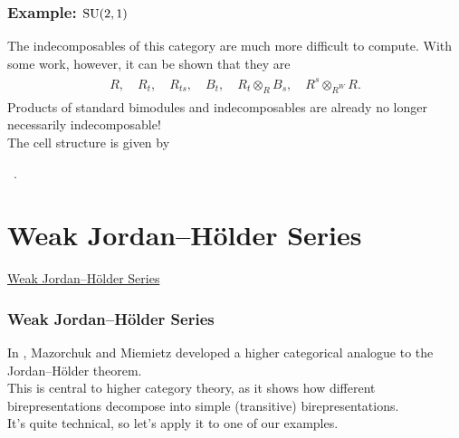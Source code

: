 \documentclass{beamer}
\begin{document}
\begin{frame}
\frametitle{Example: $\textup{SU}(2, 1)$}
The indecomposables of this category are much more difficult to compute. With some work, however, it can be shown that they are
\begin{align*}
\begin{split}
R,\quad R_t,\quad R_{ts},\quad B_t,\quad R_t \otimes_R B_s,\quad R^s \otimes_{R^W} R.
\end{split}
\end{align*}
\noindent Products of standard bimodules and indecomposables are already no longer necessarily indecomposable!\\[2ex]
The cell structure is given by
\begin{center}
\ .
\end{center}
\end{frame}


\section{Weak Jordan--H\"{o}lder Series}

\begin{frame}
\noindent\centerline{\LARGE\textcolor{structure}{\underline{Weak Jordan--H\"{o}lder Series}}}
\end{frame}

\begin{frame}
\frametitle{Weak Jordan--H\"{o}lder Series}
In \cite[Theorem 8]{MM16}, Mazorchuk and Miemietz developed a higher categorical analogue to the Jordan--H\"{o}lder theorem.\\[2ex]
This is central to higher category theory, as it shows how different birepresentations decompose into simple (transitive) birepresentations.\\[2ex]
It's quite technical, so let's apply it to one of our examples.
\end{frame}
\end{document}
